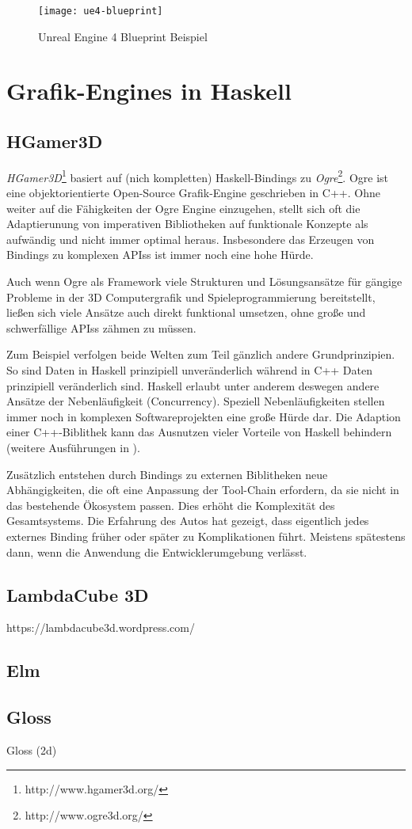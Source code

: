 \begin{figure}
\centering
\texttt{[image: ue4-blueprint]}
\caption{Unreal Engine 4 Blueprint Beispiel}
\end{figure}



\section{Grafik-Engines in Haskell}

\subsection{HGamer3D}

\textit{HGamer3D}\footnote{http://www.hgamer3d.org/} basiert auf (nich kompletten) Haskell-Bindings zu \textit{Ogre}\footnote{http://www.ogre3d.org/}. Ogre ist eine objektorientierte Open-Source Grafik-Engine geschrieben in C++. Ohne weiter auf die Fähigkeiten der Ogre Engine einzugehen, stellt sich oft die Adaptierunung von imperativen Bibliotheken auf funktionale Konzepte als aufwändig und nicht immer optimal heraus. Insbesondere das Erzeugen von Bindings zu komplexen \acsp{API}s ist immer noch eine hohe Hürde.

Auch wenn Ogre als Framework viele Strukturen und Lösungsansätze für gängige Probleme in der 3D Computergrafik und Spieleprogrammierung bereitstellt, ließen sich viele Ansätze auch direkt funktional umsetzen, ohne große und schwerfällige \acsp{API}s zähmen zu müssen.

Zum Beispiel verfolgen beide Welten zum Teil gänzlich andere Grundprinzipien. So sind Daten in Haskell prinzipiell unveränderlich während in C++ Daten prinzipiell veränderlich sind. Haskell erlaubt unter anderem deswegen andere Ansätze der Nebenläufigkeit (Concurrency). Speziell Nebenläufigkeiten stellen immer noch in komplexen Softwareprojekten eine große Hürde dar. Die Adaption einer C++-Biblithek kann das Ausnutzen vieler Vorteile von Haskell behindern (weitere Ausführungen in ).

Zusätzlich entstehen durch Bindings zu externen Biblitheken neue Abhängigkeiten, die oft eine Anpassung der Tool-Chain erfordern, da sie nicht in das bestehende Ökosystem passen. Dies erhöht die Komplexität des Gesamtsystems. Die Erfahrung des Autos hat gezeigt, dass eigentlich jedes externes Binding früher oder später zu Komplikationen führt. Meistens spätestens dann, wenn die Anwendung die Entwicklerumgebung verlässt.

\subsection{LambdaCube 3D}
https://lambdacube3d.wordpress.com/

\subsection{Elm}

\subsection{Gloss}
Gloss (2d)


